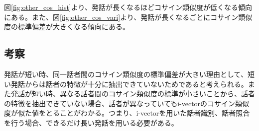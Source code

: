 図\ref{fig:other_cos_hist}より、発話が長くなるほどコサイン類似度が低くなる傾向にある。また、図\ref{fig:other_cos_vari}より、発話が長くなるごとにコサイン類似度の標準偏差が大きくなる傾向にある。\par

\subsection{考察}
発話が短い時、同一話者間のコサイン類似度の標準偏差が大きい理由として、短い発話からは話者の特徴が十分に抽出できていないためであると考えられる。また発話が短い時、異なる話者間のコサイン類似度の標準が小さいことから、話者の特徴を抽出できていない場合、話者が異なっていてもi-vectorのコサイン類似度が似た値をとることがわかる。つまり、i-vectorを用いた話者識別、話者照合を行う場合、できるだけ長い発話を用いる必要がある。
